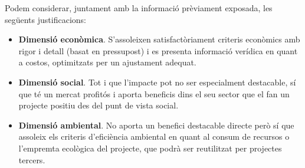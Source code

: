 Podem considerar, juntament amb la informació prèviament exposada, les següents justificacions:

\begin{itemize}
\item \textbf{Dimensió econòmica}. S’assoleixen satisfactòriament criteris econòmics amb rigor i detall (basat en pressupost) i es presenta informació verídica en quant a costos, optimitzats per un ajustament adequat.
\item \textbf{Dimensió social}. Tot i que l’impacte pot no ser especialment destacable, sí que té un mercat profitós i aporta beneficis dins el seu sector que el fan un projecte positiu des del punt de vista social.
\item \textbf{Dimensió ambiental}. No aporta un benefici destacable directe però sí que assoleix els criteris d’eficiència ambiental en quant al consum de recursos o l’empremta ecològica del projecte, que podrà ser reutilitzat per projectes tercers.
\end{itemize}